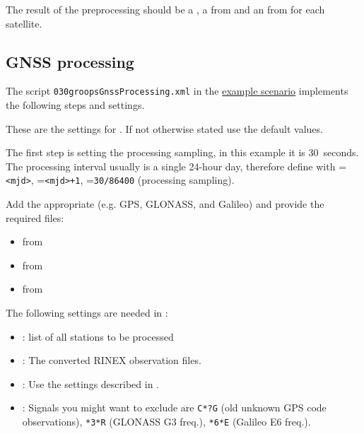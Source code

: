 The result of the preprocessing should be a ,
a  from 
and an  from  for each satellite.

\subsection{GNSS processing}\label{cookbook.gnssNetwork:processing}
The script \verb|030groopsGnssProcessing.xml| in the \href{https://ftp.tugraz.at/outgoing/ITSG/groops/scenario/scenarioGnssNetwork.zip}{example scenario}
implements the following steps and settings.

These are the settings for . If not otherwise stated use the default values.

The first step is setting the processing sampling, in this example it is 30~seconds.
The processing interval usually is a single 24-hour day, therefore define
 with =\verb|<mjd>|,
=\verb|<mjd>+1|, =\verb|30/86400| (processing sampling).

Add the appropriate  (e.g. GPS, GLONASS, and Galileo)
and provide the required files:
\begin{itemize}
  \item {} from 
  \item {} from 
  \item {} from 
\end{itemize}

The following settings are needed in :
\begin{itemize}
   \item {}: list of all stations to be processed
   \item {}: The converted RINEX observation files.
   \item {}: Use the settings described in .
   \item {}: Signals you might want to exclude are \verb|C*?G| (old unknown GPS code observations), \verb|*3*R| (GLONASS G3 freq.), \verb|*6*E| (Galileo E6 freq.).
\end{itemize}

